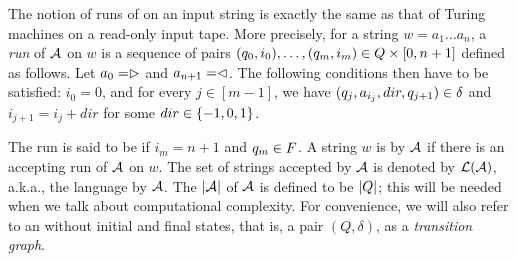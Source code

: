 The notion of runs of \FFA{} on an input string is exactly the same as that of
Turing machines on a read-only input tape. More precisely, for a string 
$w = a_1 \dots a_n$, a \emph{run} of $\mathcal{A}$ on $w$
is a sequence of pairs $(q_0,i_0),\ldots, (q_m,i_m) \in Q \times [0, n+1]$ 
defined as follows. Let $a_0 = \vartriangleright$ and $a_{n+1} = \vartriangleleft$. The
following conditions then have to be satisfied: $i_0 = 0$, and for every $j \in [m-1]$, we have $(q_j,a_{i_j}, dir, q_{j+1}) \in
	\delta$ and $i_{j+1} = i_j + dir$ for some $dir \in  \{-1, 0, 1\}$.

The run is said to be  if $i_m = n+1$ and $q_m \in F$.
A string $w$ is  by $\mathcal{A}$ if there is an accepting run of
$\mathcal{A}$ on $w$. The set of strings accepted by $\mathcal{A}$ is denoted by $\mathcal{L}(\mathcal{A})$,
a.k.a., the language  by $\mathcal{A}$.
The  $|\mathcal{A}|$ of $\mathcal{A}$ is defined to be $|Q|$; this will
be needed when we talk about computational complexity.
%
For convenience, we will also refer to an \FA{} without initial and final states, that is, a pair $(Q, \delta)$, as a \emph{transition graph}.


